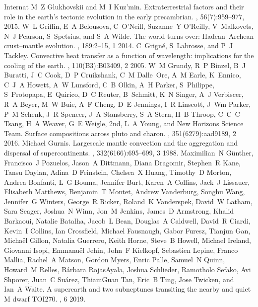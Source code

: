 \documentclass[letterpaper,10pt,english]{jupyterBook}
\begin{document}
\begin{sphinxthebibliography}{Internat}
\sphinxAtStartPar
M Z Glukhovskii and M I Kuz'min. Extraterrestrial factors and their role in the earth's tectonic evolution in the early precambrian. , 56(7):959–977, 2015.
\sphinxAtStartPar
W L Griffin, E A Belousova, C O'Neill, Suzanne Y O'Reilly, V Malkovets, N J Pearson, S Spetsius, and S A Wilde. The world turns over: Hadean–Archean crust–mantle evolution. , 189:2–15, 1 2014.
\sphinxAtStartPar
C Grigné, S Labrosse, and P J Tackley. Convective heat transfer as a function of wavelength: implications for the cooling of the earth. , 110(B3):B03409, 2 2005.
\sphinxAtStartPar
W M Grundy, R P Binzel, B J Buratti, J C Cook, D P Cruikshank, C M Dalle Ore, A M Earle, K Ennico, C J A Howett, A W Lunsford, C B Olkin, A H Parker, S Philippe, S Protopapa, E Quirico, D C Reuter, B Schmitt, K N Singer, A J Verbiscer, R A Beyer, M W Buie, A F Cheng, D E Jennings, I R Linscott, J Wm Parker, P M Schenk, J R Spencer, J A Stansberry, S A Stern, H B Throop, C C C Tsang, H A Weaver, G E Weigle, 2nd, L A Young, and New Horizons Science Team. Surface compositions across pluto and charon. , 351(6279):aad9189, 2 2016.
\sphinxAtStartPar
Michael Gurnis. Large\sphinxhyphen{}scale mantle convection and the aggregation and dispersal of supercontinents. , 332(6166):695–699, 3 1988.
\sphinxAtStartPar
Maximilian N Günther, Francisco J Pozuelos, Jason A Dittmann, Diana Dragomir, Stephen R Kane, Tansu Daylan, Adina D Feinstein, Chelsea X Huang, Timothy D Morton, Andrea Bonfanti, L G Bouma, Jennifer Burt, Karen A Collins, Jack J Lissauer, Elisabeth Matthews, Benjamin T Montet, Andrew Vanderburg, Songhu Wang, Jennifer G Winters, George R Ricker, Roland K Vanderspek, David W Latham, Sara Seager, Joshua N Winn, Jon M Jenkins, James D Armstrong, Khalid Barkaoui, Natalie Batalha, Jacob L Bean, Douglas A Caldwell, David R Ciardi, Kevin I Collins, Ian Crossfield, Michael Fausnaugh, Gabor Furesz, Tianjun Gan, Michaël Gillon, Natalia Guerrero, Keith Horne, Steve B Howell, Michael Ireland, Giovanni Isopi, Emmanuël Jehin, John F Kielkopf, Sebastien Lepine, Franco Mallia, Rachel A Matson, Gordon Myers, Enric Palle, Samuel N Quinn, Howard M Relles, Bárbara Rojas\sphinxhyphen{}Ayala, Joshua Schlieder, Ramotholo Sefako, Avi Shporer, Juan C Suárez, Thiam\sphinxhyphen{}Guan Tan, Eric B Ting, Jose Twicken, and Ian A Waite. A super\sphinxhyphen{}earth and two sub\sphinxhyphen{}neptunes transiting the nearby and quiet M dwarf TOI\sphinxhyphen{}270. , 6 2019.

\end{sphinxthebibliography}
\end{document}
